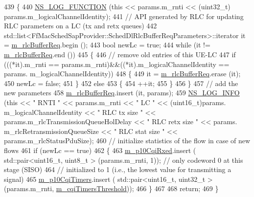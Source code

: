\begin{DoxyCode}
439 \{
440   \hyperlink{log-macros-disabled_8h_a90b90d5bad1f39cb1b64923ea94c0761}{NS\_LOG\_FUNCTION} (\textcolor{keyword}{this} << params.m\_rnti << (uint32\_t) params.m\_logicalChannelIdentity);
441   \textcolor{comment}{// API generated by RLC for updating RLC parameters on a LC (tx and retx queues)}
442   std::list<FfMacSchedSapProvider::SchedDlRlcBufferReqParameters>::iterator it = 
      \hyperlink{classns3_1_1RrFfMacScheduler_a25a4bfbb928e22dc026209de004b90fd}{m\_rlcBufferReq}.begin ();
443   \textcolor{keywordtype}{bool} newLc = \textcolor{keyword}{true};
444   \textcolor{keywordflow}{while} (it != \hyperlink{classns3_1_1RrFfMacScheduler_a25a4bfbb928e22dc026209de004b90fd}{m\_rlcBufferReq}.end ())
445     \{
446       \textcolor{comment}{// remove old entries of this UE-LC}
447       \textcolor{keywordflow}{if} (((*it).m\_rnti == params.m\_rnti)&&((*it).m\_logicalChannelIdentity == params.
      m\_logicalChannelIdentity))
448         \{
449           it = \hyperlink{classns3_1_1RrFfMacScheduler_a25a4bfbb928e22dc026209de004b90fd}{m\_rlcBufferReq}.erase (it);
450           newLc = \textcolor{keyword}{false};
451         \}
452       \textcolor{keywordflow}{else}
453         \{
454           ++it;
455         \}
456     \}
457   \textcolor{comment}{// add the new parameters}
458   \hyperlink{classns3_1_1RrFfMacScheduler_a25a4bfbb928e22dc026209de004b90fd}{m\_rlcBufferReq}.insert (it, params);
459   \hyperlink{group__logging_gafbd73ee2cf9f26b319f49086d8e860fb}{NS\_LOG\_INFO} (\textcolor{keyword}{this} << \textcolor{stringliteral}{" RNTI "} << params.m\_rnti << \textcolor{stringliteral}{" LC "} << (uint16\_t)params.
      m\_logicalChannelIdentity << \textcolor{stringliteral}{" RLC tx size "} << params.m\_rlcTransmissionQueueHolDelay << \textcolor{stringliteral}{" RLC retx size "} << params.
      m\_rlcRetransmissionQueueSize << \textcolor{stringliteral}{" RLC stat size "} <<  params.m\_rlcStatusPduSize);
460   \textcolor{comment}{// initialize statistics of the flow in case of new flows}
461   \textcolor{keywordflow}{if} (newLc == \textcolor{keyword}{true})
462     \{
463       \hyperlink{classns3_1_1RrFfMacScheduler_aabdb8d68324faae8a279df6378d589b7}{m\_p10CqiRxed}.insert ( std::pair<uint16\_t, uint8\_t > (params.m\_rnti, 1)); \textcolor{comment}{// only codeword
       0 at this stage (SISO)}
464       \textcolor{comment}{// initialized to 1 (i.e., the lowest value for transmitting a signal)}
465       \hyperlink{classns3_1_1RrFfMacScheduler_a1c5527d9b000ec9f4998595b47d54ad2}{m\_p10CqiTimers}.insert ( std::pair<uint16\_t, uint32\_t > (params.m\_rnti, 
      \hyperlink{classns3_1_1RrFfMacScheduler_a51ae1963d7d95e89917af4c603f08a91}{m\_cqiTimersThreshold}));
466     \}
467 
468   \textcolor{keywordflow}{return};
469 \}
\end{DoxyCode}


